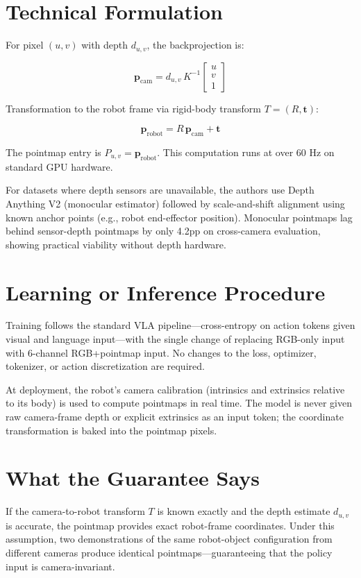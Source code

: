 \documentclass[10pt,twocolumn]{article}
\begin{document}
\section{Technical Formulation}

For pixel $(u, v)$ with depth $d_{u,v}$, the backprojection is:

\[
  \mathbf{p}_\text{cam} = d_{u,v}\, K^{-1}
    \begin{bmatrix} u \\ v \\ 1 \end{bmatrix}
\]

Transformation to the robot frame via rigid-body transform
$T = (R, \mathbf{t})$:

\[
  \mathbf{p}_\text{robot} = R\,\mathbf{p}_\text{cam} + \mathbf{t}
\]

The pointmap entry is $P_{u,v} = \mathbf{p}_\text{robot}$.
This computation runs at over 60 Hz on standard GPU hardware.

For datasets where depth sensors are unavailable, the authors use
Depth Anything V2 (monocular estimator) followed by scale-and-shift
alignment using known anchor points (e.g., robot end-effector position).
Monocular pointmaps lag behind sensor-depth pointmaps by only 4.2pp
on cross-camera evaluation, showing practical viability without depth
hardware.

\section{Learning or Inference Procedure}

Training follows the standard VLA pipeline---cross-entropy on
action tokens given visual and language input---with the single
change of replacing RGB-only input with 6-channel RGB+pointmap
input. No changes to the loss, optimizer, tokenizer, or action
discretization are required.

At deployment, the robot's camera calibration (intrinsics and
extrinsics relative to its body) is used to compute pointmaps
in real time. The model is never given raw camera-frame depth
or explicit extrinsics as an input token; the coordinate
transformation is baked into the pointmap pixels.

\section{What the Guarantee Says}

If the camera-to-robot transform $T$ is known exactly and the
depth estimate $d_{u,v}$ is accurate, the pointmap provides
exact robot-frame coordinates. Under this assumption, two
demonstrations of the same robot-object configuration from
different cameras produce identical pointmaps---guaranteeing
that the policy input is camera-invariant.
\end{document}
